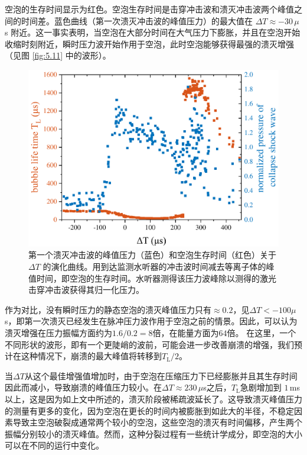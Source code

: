 空泡的生存时间显示为红色。空泡生存时间是击穿冲击波和溃灭冲击波两个峰值之间的时间差。蓝色曲线（第一次溃灭冲击波的峰值压力）的最大值在
$\Delta T\approx -30\,\mu$ s
附近。这一事实表明，当空泡在大部分时间在大气压力下膨胀，并且在空泡开始收缩时刻附近，瞬时压力波开始作用于空泡，此时空泡能够获得最强的溃灭增强（见图
\ref{fig:5.11} 中的波形）。

\begin{figure}[H]
  \centering
  \includegraphics[width=1\linewidth]{img/fig5.18.pdf}
  \caption[第一个溃灭冲击波的峰值压力（蓝色）和空泡生存时间（红色）关于
$\Delta T$
的演化曲线]{第一个溃灭冲击波的峰值压力（蓝色）和空泡生存时间（红色）关于
$\Delta T$
的演化曲线。用到达监测水听器的冲击波时间减去等离子体的峰值时间，即空泡的生存时间。水听器测得该压力波峰除以测得的激光击穿冲击波获得其归一化压力。}
  \label{fig:5.18}
\end{figure}



作为对比，没有瞬时压力的静态空泡的溃灭峰值压力只有$\approx 0.2$，见$\Delta T<-100\mu$s，即第一次溃灭已经发生在脉冲压力波作用于空泡之前的情景。因此，可以认为溃灭增强在压力振幅方面约为$1.6/0.2=8$倍，在能量方面为$64$倍。
在这里，一个不同形状的波形，即有一个更陡峭的波前，可能会进一步改善崩溃的增强，我们预计在这种情况下，崩溃的最大峰值将转移到$T_\mathrm{L}/2$。

当$\Delta T$从这个最佳增强值增加时，由于空泡在压缩压力下已经膨胀并且其生存时间因此而减小，导致崩溃的峰值压力较小。在$\Delta T\approx230\,\mu$s之后，$T_\mathrm{L}$急剧增加到
$1\,$ms以上，这是因为如上文中所述的，溃灭阶段被稀疏波延长了。这导致溃灭峰值压力的测量有更多的变化，因为空泡在更长的时间内被膨胀到如此大的半径，不稳定因素导致主空泡破裂成通常两个较小的空泡，这些空泡的溃灭有时间偏移，产生两个振幅分别较小的溃灭峰值。然而，这种分裂过程有一些统计学成分，即空泡的大小可以在不同的运行中变化。

